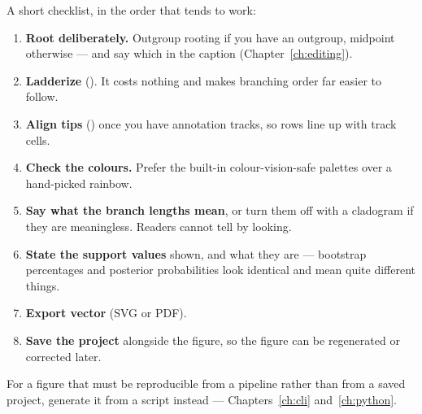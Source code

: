 A short checklist, in the order that tends to work:

\begin{enumerate}
  \item \textbf{Root deliberately.} Outgroup rooting if you have an outgroup,
        midpoint otherwise --- and say which in the caption
        (Chapter~\ref{ch:editing}).
  \item \textbf{Ladderize} (). It costs nothing and makes branching
        order far easier to follow.
  \item \textbf{Align tips} () once you have annotation tracks, so rows
        line up with track cells.
  \item \textbf{Check the colours.} Prefer the built-in colour-vision-safe
        palettes over a hand-picked rainbow.
  \item \textbf{Say what the branch lengths mean}, or turn them off with a
        cladogram if they are meaningless. Readers cannot tell by looking.
  \item \textbf{State the support values} shown, and what they are --- bootstrap
        percentages and posterior probabilities look identical and mean quite
        different things.
  \item \textbf{Export vector} (SVG or PDF).
  \item \textbf{Save the project} alongside the figure, so the figure can be
        regenerated or corrected later.
\end{enumerate}

For a figure that must be reproducible from a pipeline rather than from a saved
project, generate it from a script instead --- Chapters~\ref{ch:cli}
and~\ref{ch:python}.

